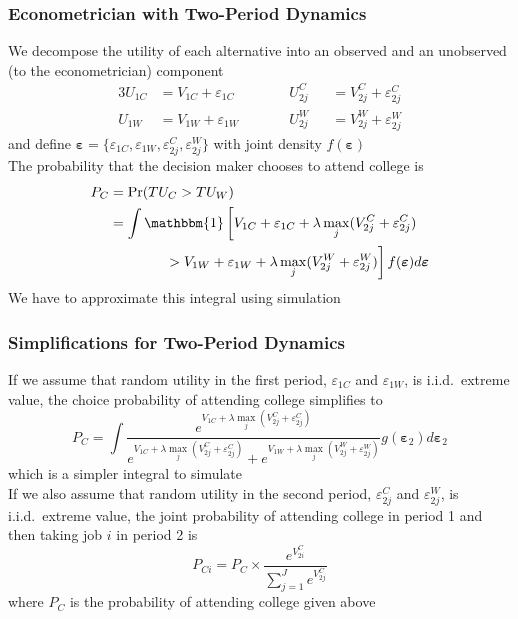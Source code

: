 \documentclass{beamer}
\begin{document}
\begin{frame}\frametitle{Econometrician with Two-Period Dynamics}
    We decompose the utility of each alternative into an observed and an unobserved (to the econometrician) component
    \begin{alignat*}{3}
        U_{1C} & = V_{1C} + \varepsilon_{1C} \qquad && U_{2j}^C && = V_{2j}^C + \varepsilon_{2j}^C \\
        U_{1W} & = V_{1W} + \varepsilon_{1W} \qquad && U_{2j}^W && = V_{2j}^W + \varepsilon_{2j}^W
    \end{alignat*}
    and define $\bm{\varepsilon} = \{\varepsilon_{1C},\varepsilon_{1W}, \varepsilon_{2j}^C, \varepsilon_{2j}^W\}$ with joint density $f(\bm{\varepsilon})$ \\
    \vspace{2ex}
    The probability that the decision maker chooses to attend college is
    \begin{align*}
        P_C & = \Pr(TU_C > TU_W) \\
        & = \int \mathbbm{1} \left[ V_{1C} + \varepsilon_{1C} + \lambda \max_j(V_{2j}^C + \varepsilon_{2j}^C) \right. \\
        &\left. \qquad \qquad > V_{1W} + \varepsilon_{1W} + \lambda \max_j(V_{2j}^W + \varepsilon_{2j}^W)\right] f(\bm{\varepsilon}) d \bm{\varepsilon}
    \end{align*}
    We have to approximate this integral using simulation
\end{frame}

\begin{frame}\frametitle{Simplifications for Two-Period Dynamics}
    If we assume that random utility in the first period, $\varepsilon_{1C}$ and $\varepsilon_{1W}$, is i.i.d.\ extreme value, the choice probability of attending college simplifies to
    $$P_C = \int \frac{e^{V_{1C} + \lambda \max_j(V_{2j}^C + \varepsilon_{2j}^C)}}{e^{V_{1C} + \lambda \max_j(V_{2j}^C + \varepsilon_{2j}^C)} + e^{V_{1W} + \lambda \max_j(V_{2j}^W + \varepsilon_{2j}^W)}} g(\bm{\varepsilon}_2) d \bm{\varepsilon}_2$$
    which is a simpler integral to simulate \\
    \vspace{3ex}
    If we also assume that random utility in the second period, $\varepsilon_{2j}^C$ and $\varepsilon_{2j}^W$, is i.i.d.\ extreme value, the joint probability of attending college in period 1 and then taking job $i$ in period 2 is
    $$P_{Ci} = P_C \times \frac{e^{V_{2i}^C}}{\sum_{j = 1}^J e^{{V_{2j}^C}}}$$
    where $P_C$ is the probability of attending college given above
\end{frame}
\end{document}
